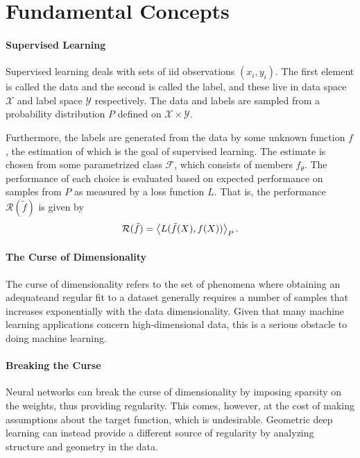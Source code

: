 \section{Fundamental Concepts}

\paragraph{Supervised Learning}
Supervised learning deals with sets of iid observations $(x_{i}, y_{i})$. The first element is called the data and the second is called the label, and these live in data space $\mathcal{X}$ and label space $\mathcal{Y}$ respectively. The data and labels are sampled from a probability distribution $P$ defined on $\mathcal{X}\times\mathcal{Y}$.

Furthermore, the labels are generated from the data by some unknown function $f$, the estimation of which is the goal of supervised learning. The estimate is chosen from some parametrized class $\mathcal{F}$, which consists of members $f_{\theta}$. The performance of each choice is evaluated based on expected performance on samples from $P$ as measured by a loss function $L$. That is, the performance $\mathcal{R}(\tilde{f})$ is given by
\begin{align}
  \mathcal{R}(\tilde{f}) = \expval{L(\tilde{f}(X), f(X))}_{P}.
\end{align}

\paragraph{The Curse of Dimensionality}
The curse of dimensionality refers to the set of phenomena where obtaining an adequateand regular fit to a dataset generally requires a number of samples that increases exponentially with the data dimensionality. Given that many machine learning applications concern high-dimensional data, this is a serious obstacle to doing machine learning.

\paragraph{Breaking the Curse}
Neural networks can break the curse of dimensionality by imposing sparsity on the weights, thus providing regularity. This comes, however, at the cost of making assumptions about the target function, which is undesirable. Geometric deep learning can instead provide a different source of regularity by analyzing structure and geometry in the data.

